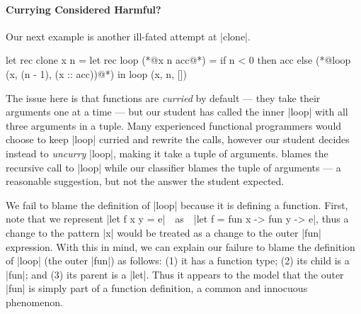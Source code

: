 \paragraph{Currying Considered Harmful?}
Our next example is another ill-fated attempt at |clone|.
%
\begin{ecode}
  let rec clone x n =
    let rec loop (*@\colorbox{fix!75}{x n acc}@*) =
      if n < 0 then
        acc
      else
        (*@\colorbox{sherrloc!75}{loop} \colorbox{tree!75}{(x, (n - 1), (x :: acc))}@*) in
    loop (x, n, [])
\end{ecode}
%
The issue here is that \ocaml functions are \emph{curried} by default
--- \ie they take their arguments one at a time --- but our student has
called the inner |loop| with all three arguments in a tuple.
%
Many experienced functional programmers would choose to keep |loop|
curried and rewrite the calls, however our student decides instead to
\emph{uncurry} |loop|, making it take a tuple of arguments.
%
\sherrloc blames the recursive call to |loop| while our classifier
blames the tuple of arguments --- a reasonable suggestion, but not
the answer the student expected.

We fail to blame the definition of |loop| because it is defining a
function.
%
First, note that we represent |let f x y = e|\ \ as\ \ |let f = fun x -> fun y -> e|,
thus a change to the pattern |x| would be treated as a change to the outer
|fun| expression.
%
With this in mind, we can explain our failure to blame the definition of
|loop| (the outer |fun|) as follows:
%
(1) it has a function type;
%
(2) its child is a |fun|; and
%
(3) its parent is a |let|.
%
Thus it appears to the model that the outer |fun| is simply part of a
function definition, a common and innocuous phenomenon.


